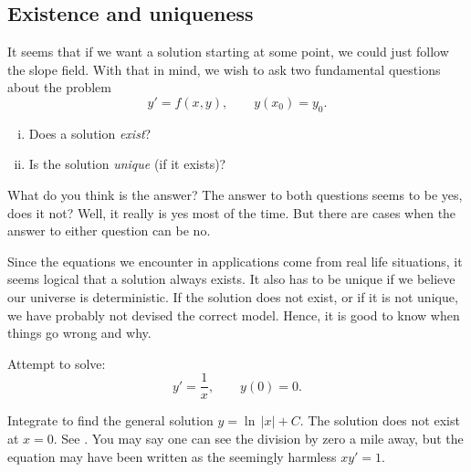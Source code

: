\subsection{Existence and uniqueness}

It seems that if we want a solution starting at some point,
we could just follow the slope field.
With that in mind,
we wish to ask two fundamental questions about the problem
\begin{equation*}
y' = f(x,y), \qquad y(x_0) = y_0.
\end{equation*}
\begin{enumerate}[(i)]
\item Does a solution \emph{exist}?
\item Is the solution \emph{unique} (if it exists)?
\end{enumerate}

What do you think is the answer?
The answer to both questions seems to be yes, does it not?
Well, it really is yes most of the time.  But there
are cases when the answer to either question can be no.

Since the equations we encounter in applications
come from real life situations, it seems
logical that a solution always exists.
It also has to be unique if we believe our
universe is deterministic.  If the solution does not exist, or if it is
not unique, we have
probably not devised the correct model.  Hence, it is good to know
when things go wrong and why.

\begin{example}
Attempt to solve:
\begin{equation*}
y' = \frac{1}{x}, \qquad y(0) = 0 .
\end{equation*}

Integrate to find the general solution $y = \ln \, \lvert x \rvert + C$.  The
solution does not exist at $x=0$.  See .
You may say one can see the division by zero a mile away, but
the equation may have been written as the seemingly harmless $x y' = 1$.

\begin{myfig}
\parbox[t]{3in}{
 \capstart
 \caption{Slope field of $y' = \nicefrac{1}{x}$.\label{1.3:xinvfig}}
}
\quad
\parbox[t]{3in}{
 \capstart
 \caption{Slope field of $y' = 2 \sqrt{\lvert y \rvert}$ with two
 solutions satisfying $y(0) = 0$.\label{1.3:sqrtfig}}
}
\end{myfig}
\end{example}

